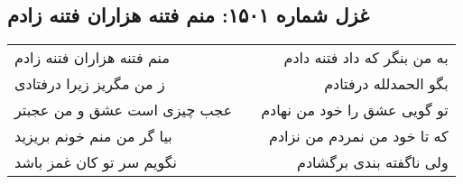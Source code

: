 \begin{center}
\section*{غزل شماره ۱۵۰۱: منم فتنه هزاران فتنه زادم}
\label{sec:1501}
\begin{longtable}{l p{0.5cm} r}
منم فتنه هزاران فتنه زادم
&&
به من بنگر که داد فتنه دادم
\\
ز من مگریز زیرا درفتادی
&&
بگو الحمدلله درفتادم
\\
عجب چیزی است عشق و من عجبتر
&&
تو گویی عشق را خود من نهادم
\\
بیا گر من منم خونم بریزید
&&
که تا خود من نمردم من نزادم
\\
نگویم سر تو کان غمز باشد
&&
ولی ناگفته بندی برگشادم
\\
\end{longtable}
\end{center}
